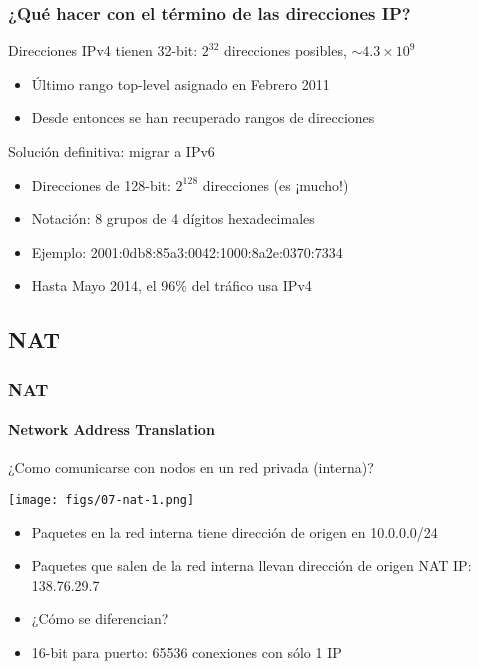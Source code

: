 \documentclass[letter]{beamer}
\begin{document}
\begin{frame}
  \frametitle{¿Qué hacer con el término de las direcciones IP?}

  Direcciones IPv4 tienen 32-bit: $2^{32}$ direcciones posibles, $\sim 4.3 \times 10^9$
  \begin{itemize}
    \item Último rango top-level asignado en Febrero 2011
    \item Desde entonces se han recuperado rangos de direcciones
  \end{itemize}
  Solución definitiva: migrar a IPv6
  \begin{itemize}
    \item Direcciones de 128-bit: $2^{128}$ direcciones (es ¡mucho!)
    \item Notación: 8 grupos de 4 dígitos hexadecimales
    \item Ejemplo: 2001:0db8:85a3:0042:1000:8a2e:0370:7334
    \item Hasta Mayo 2014, el 96\% del tráfico usa IPv4
  \end{itemize}

\end{frame}
\subsection{NAT}

\begin{frame}
  \frametitle{NAT}
  \framesubtitle{Network Address Translation}

  ¿Como comunicarse con nodos en un red privada (interna)?

  \begin{center}
    \texttt{[image: figs/07-nat-1.png]}
  \end{center}

  \begin{itemize}
    \item Paquetes en la red interna tiene dirección de origen en 10.0.0.0/24
    \item Paquetes que salen de la red interna llevan dirección de origen
          NAT IP: 138.76.29.7
    \item ¿Cómo se diferencian? 
    \item<3->16-bit para puerto: 65536 conexiones con sólo 1 IP
  \end{itemize}

\end{frame}
\end{document}
